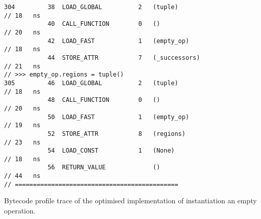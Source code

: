 \begin{code}
\begin{verbatim}
304         38  LOAD_GLOBAL          2   (tuple)                                            // 18   ns
            40  CALL_FUNCTION        0   ()                                                 // 20   ns
            42  LOAD_FAST            1   (empty_op)                                         // 18   ns
            44  STORE_ATTR           7   (_successors)                                      // 21   ns
// >>> empty_op.regions = tuple()
305         46  LOAD_GLOBAL          2   (tuple)                                            // 18   ns
            48  CALL_FUNCTION        0   ()                                                 // 20   ns
            50  LOAD_FAST            1   (empty_op)                                         // 19   ns
            52  STORE_ATTR           8   (regions)                                          // 23   ns
            54  LOAD_CONST           1   (None)                                             // 18   ns
            56  RETURN_VALUE             ()                                                 // 44   ns
// =============================================
    \end{verbatim}
    \caption{Bytecode profile trace of the optimised implementation of instantiation an empty operation.}
    \label{listing:bytecode-profiles-op-build-optimised}
\end{code}



